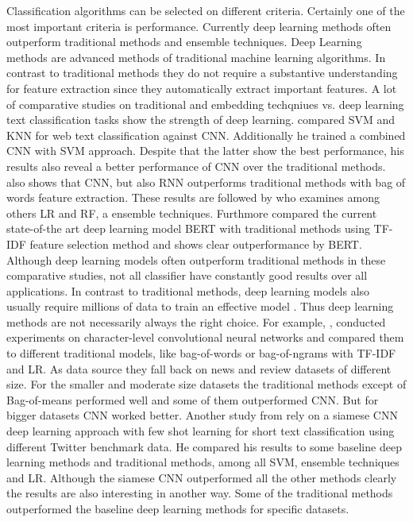 \documentclass[12pt, a4paper, titlepage]{article}
\begin{document}
Classification algorithms can be selected on different criteria. Certainly one of the most important criteria is performance. Currently deep learning methods often outperform traditional methods and ensemble techniques. Deep Learning methods are advanced methods of traditional machine learning algorithms. In contrast to traditional methods they do not require a substantive understanding for feature extraction since they automatically extract important features. A lot of comparative studies on traditional and embedding techqniues vs. deep learning text classification tasks show the strength of deep learning. \citet{wang2017} compared \ac{SVM} and \ac{KNN} for web text classification against \ac{CNN}. Additionally he trained a combined \ac{CNN} with \ac{SVM} approach. Despite that the latter show the best performance, his results also reveal a better performance of \ac{CNN} over the traditional methods. \citet{hassan2017} also shows that \ac{CNN}, but also \ac{RNN} outperforms traditional methods with bag of words feature extraction. These results are followed by \citet{kamath2018} who examines among others \ac{LR} and \ac{RF}, a ensemble techniques. Furthmore \citet{gonzalez2020} compared the current state-of-the art deep learning model \ac{BERT} with traditional methods using \ac{TF-IDF} feature selection method and shows clear outperformance by \ac{BERT}. Although deep learning models often outperform traditional methods in these comparative studies, not all classifier have constantly good results over all applications. In contrast to traditional methods, deep learning models also usually require millions of data to train an effective model \citep{chauhan2018}. Thus deep learning methods are not necessarily always the right choice. For example, \citet{zhang2015}, conducted experiments on character-level convolutional neural networks and compared them to different traditional models, like bag-of-words or bag-of-ngrams with \ac{TF-IDF} and \ac{LR}. As data source they fall back on news and review datasets of different size. For the smaller and moderate size datasets the traditional methods except of Bag-of-means performed well and some of them outperformed \ac{CNN}. But for bigger datasets \ac{CNN} worked better. Another study from \citet{yan2018} rely on a siamese CNN deep learning approach with few shot learning for short text classification using different Twitter benchmark data. He compared his results to some baseline deep learning methods and traditional methods, among all \ac{SVM}, ensemble techniques and \ac{LR}. Although the siamese CNN outperformed all the other methods clearly the results are also interesting in another way. Some of the traditional methods outperformed the baseline deep learning methods for specific datasets. 
\end{document}
